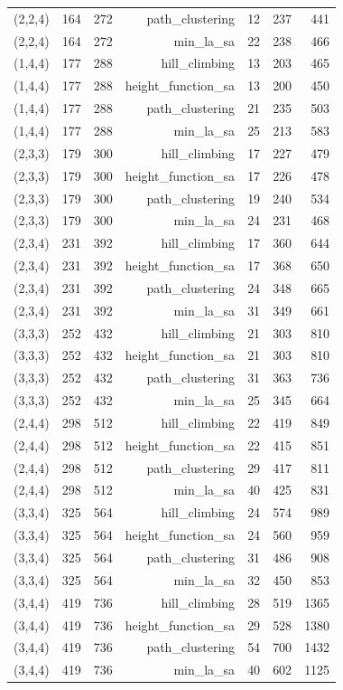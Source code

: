 \begin{longtable}{lrrrrrr}
  (2,2,4) & 164 & 272 & path\_clustering & 12 & 237 & 441 \\
  (2,2,4) & 164 & 272 & min\_la\_sa & 22 & 238 & 466 \\
  (1,4,4) & 177 & 288 & hill\_climbing & 13 & 203 & 465 \\
  (1,4,4) & 177 & 288 & height\_function\_sa & 13 & 200 & 450 \\
  (1,4,4) & 177 & 288 & path\_clustering & 21 & 235 & 503 \\
  (1,4,4) & 177 & 288 & min\_la\_sa & 25 & 213 & 583 \\
  (2,3,3) & 179 & 300 & hill\_climbing & 17 & 227 & 479 \\
  (2,3,3) & 179 & 300 & height\_function\_sa & 17 & 226 & 478 \\
  (2,3,3) & 179 & 300 & path\_clustering & 19 & 240 & 534 \\
  (2,3,3) & 179 & 300 & min\_la\_sa & 24 & 231 & 468 \\
  (2,3,4) & 231 & 392 & hill\_climbing & 17 & 360 & 644 \\
  (2,3,4) & 231 & 392 & height\_function\_sa & 17 & 368 & 650 \\
  (2,3,4) & 231 & 392 & path\_clustering & 24 & 348 & 665 \\
  (2,3,4) & 231 & 392 & min\_la\_sa & 31 & 349 & 661 \\
  (3,3,3) & 252 & 432 & hill\_climbing & 21 & 303 & 810 \\
  (3,3,3) & 252 & 432 & height\_function\_sa & 21 & 303 & 810 \\
  (3,3,3) & 252 & 432 & path\_clustering & 31 & 363 & 736 \\
  (3,3,3) & 252 & 432 & min\_la\_sa & 25 & 345 & 664 \\
  (2,4,4) & 298 & 512 & hill\_climbing & 22 & 419 & 849 \\
  (2,4,4) & 298 & 512 & height\_function\_sa & 22 & 415 & 851 \\
  (2,4,4) & 298 & 512 & path\_clustering & 29 & 417 & 811 \\
  (2,4,4) & 298 & 512 & min\_la\_sa & 40 & 425 & 831 \\
  (3,3,4) & 325 & 564 & hill\_climbing & 24 & 574 & 989 \\
  (3,3,4) & 325 & 564 & height\_function\_sa & 24 & 560 & 959 \\
  (3,3,4) & 325 & 564 & path\_clustering & 31 & 486 & 908 \\
  (3,3,4) & 325 & 564 & min\_la\_sa & 32 & 450 & 853 \\
  (3,4,4) & 419 & 736 & hill\_climbing & 28 & 519 & 1365 \\
  (3,4,4) & 419 & 736 & height\_function\_sa & 29 & 528 & 1380 \\
  (3,4,4) & 419 & 736 & path\_clustering & 54 & 700 & 1432 \\
  (3,4,4) & 419 & 736 & min\_la\_sa & 40 & 602 & 1125 \\
\end{longtable}
